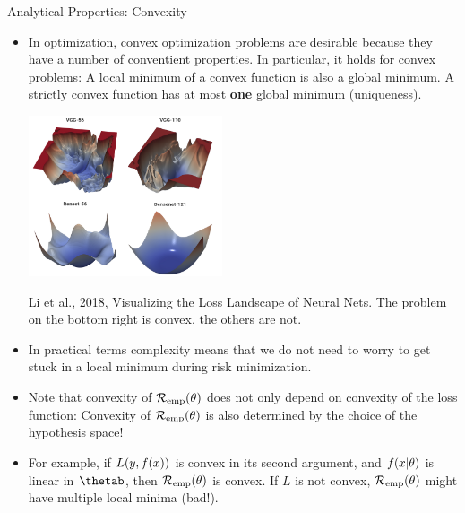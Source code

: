 \begin{vbframe}{Analytical Properties: Convexity}

\begin{itemize}
  \item In optimization, convex optimization problems are desirable because they have a number of conventient properties. In particular, it holds for convex problems: A local minimum of a convex function is also a global minimum. A strictly convex function has at most \textbf{one} global minimum (uniqueness). 
  \begin{center}
  \includegraphics[width = 0.45\textwidth]{figure_man/convex-vs-nonconfex-landscape.png} \\
  \begin{footnotesize} Li et al., 2018, Visualizing the Loss Landscape of Neural Nets. The problem on the bottom right is convex, the others are not. \end{footnotesize}
  \end{center}
  \item In practical terms complexity means that we do not need to worry to get stuck in a local minimum during risk minimization. 
  \item Note that convexity of $\mathcal{R}_{\text{emp}}(\theta)$ does not only depend on convexity of the loss function: Convexity of $\mathcal{R}_{\text{emp}}(\theta)$ is also determined by the choice of the hypothesis space!
  \item For example, if $L(y, f(x))$ is convex in its second argument, and $f(x | \theta)$ is linear in $\thetab$, then $\mathcal{R}_{\text{emp}}(\theta)$ is convex. If $L$ is not convex, $\mathcal{R}_{\text{emp}}(\theta)$ might have multiple local minima (bad!).
\end{itemize} 



\end{vbframe}


